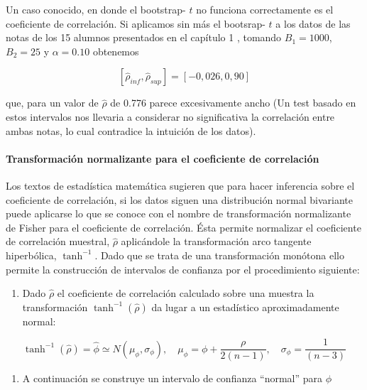 \documentclass[
]{article}
\providecommand{\tightlist}{%
  \setlength{\itemsep}{0pt}\setlength{\parskip}{0pt}}
\begin{document}
Un caso conocido, en donde el bootstrap- \(t\) no funciona correctamente es el coeficiente de correlación. Si aplicamos sin más el bootsrap- \(t\) a los datos de las notas de los 15 alumnos presentados en el capítulo 1 , tomando \(B_{1}=1000\), \(B_{2}=25\) y \(\alpha=0.10\) obtenemos

\[
\left[\hat{\rho}_{i n f}, \hat{\rho}_{s u p}\right]=[-0,026,0,90]
\]

que, para un valor de \(\hat{\rho}\) de 0.776 parece excesivamente ancho (Un test basado en estos intervalos nos llevaria a considerar no significativa la correlación entre ambas notas, lo cual contradice la intuición de los datos).

\paragraph{Transformación normalizante para el coeficiente de correlación}\label{transformaciuxf3n-normalizante-para-el-coeficiente-de-correlaciuxf3n}

Los textos de estadística matemática sugieren que para hacer inferencia sobre el coeficiente de correlación, si los datos siguen una distribución normal bivariante puede aplicarse lo que se conoce con el nombre de transformación normalizante de Fisher para el coeficiente de correlación. Ésta permite normalizar el coeficiente de correlación muestral, \(\hat{\rho}\) aplicándole la transformación arco tangente hiperbólica, \(\tanh ^{-1}\). Dado que se trata de una transformación monótona ello permite la construcción de intervalos de confianza por el procedimiento siguiente:

\begin{enumerate}
\def\labelenumi{\arabic{enumi}.}
\tightlist
\item
  Dado \(\hat{\rho}\) el coeficiente de correlación calculado sobre una muestra la transformación \(\tanh ^{-1}(\hat{\rho})\) da lugar a un estadístico aproximadamente normal:
\end{enumerate}

\[
\tanh ^{-1}(\hat{\rho})=\hat{\phi} \simeq N\left(\mu_{\phi}, \sigma_{\phi}\right), \quad \mu_{\phi}=\phi+\frac{\rho}{2(n-1)}, \quad \sigma_{\phi}=\frac{1}{(n-3)}
\]

\begin{enumerate}
\def\labelenumi{\arabic{enumi}.}
\setcounter{enumi}{1}
\tightlist
\item
  A continuación se construye un intervalo de confianza ``normal'' para \(\phi\)
\end{enumerate}
\end{document}
